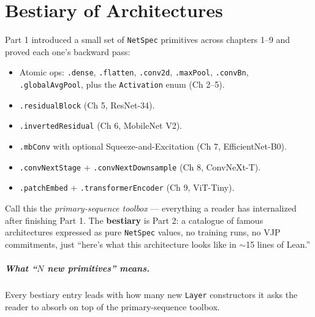 \chapter{Bestiary of Architectures}
\label{chap:bestiary}

\hypersetup{bookmarksdepth=2}

Part 1 introduced a small set of \texttt{NetSpec} primitives across
chapters 1--9 and proved each one's backward pass:

\begin{itemize}
  \item Atomic ops: \texttt{.dense}, \texttt{.flatten},
    \texttt{.conv2d}, \texttt{.maxPool}, \texttt{.convBn},
    \texttt{.globalAvgPool}, plus the \texttt{Activation} enum
    (Ch 2--5).
  \item \texttt{.residualBlock} (Ch 5, ResNet-34).
  \item \texttt{.invertedResidual} (Ch 6, MobileNet V2).
  \item \texttt{.mbConv} with optional Squeeze-and-Excitation
    (Ch 7, EfficientNet-B0).
  \item \texttt{.convNextStage} + \texttt{.convNextDownsample}
    (Ch 8, ConvNeXt-T).
  \item \texttt{.patchEmbed} + \texttt{.transformerEncoder}
    (Ch 9, ViT-Tiny).
\end{itemize}

Call this the \emph{primary-sequence toolbox} --- everything a
reader has internalized after finishing Part 1. The \textbf{bestiary}
is Part 2: a catalogue of famous architectures expressed as pure
\texttt{NetSpec} values, no training runs, no VJP commitments, just
``here's what this architecture looks like in $\sim$15 lines of Lean.''

\paragraph*{What ``\(N\) new primitives'' means.}
Every bestiary entry leads with how many new \texttt{Layer}
constructors it asks the reader to absorb on top of the
primary-sequence toolbox.

